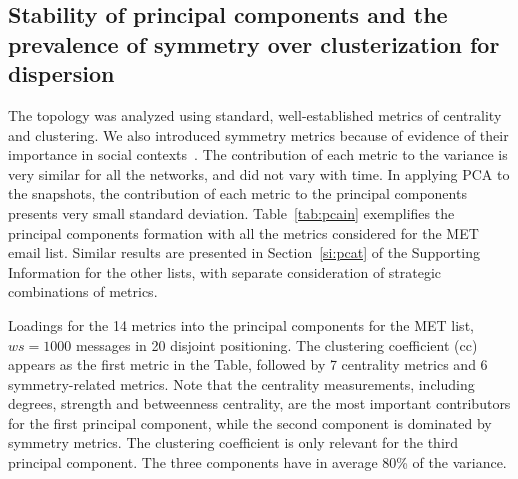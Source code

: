 \documentclass[%
	aip,
	jmp,%
	amsmath,amssymb,
	reprint,%
]{revtex4-1}
\begin{document}
\subsection{Stability of principal components and the prevalence of symmetry over clusterization for dispersion}\label{prevalence}
The topology was analyzed using standard, well-established metrics of centrality and clustering.
We also introduced symmetry metrics because of evidence of their importance in social contexts~\cite{newmanEvolving}.
The contribution of each metric to the variance is very similar for all the networks, and did not vary with time.
In applying PCA to the snapshots, the contribution of each metric to the principal components presents very small standard deviation. Table~\ref{tab:pcain} exemplifies the principal components formation with all the metrics considered for the MET email list. Similar results are presented in Section~\ref{si:pcat} of the Supporting Information for the other lists, with separate consideration of strategic combinations of metrics.

\begin{table}[!h]
	\caption{Loadings for the 14 metrics into the principal components for the MET list, $ws=1000$ messages in 20 disjoint positioning. The clustering coefficient (cc) appears as the first metric in the Table, followed by 7 centrality metrics and 6 symmetry-related metrics. Note that the centrality measurements, including degrees, strength and betweenness centrality, are the most important contributors for the first principal component, while the second component is dominated by symmetry metrics. The clustering coefficient is only relevant for the third principal component. The three components have in average 80\% of the variance.}
		\footnotesize
		
		\label{tab:pcain}
	\end{table}
\end{document}
